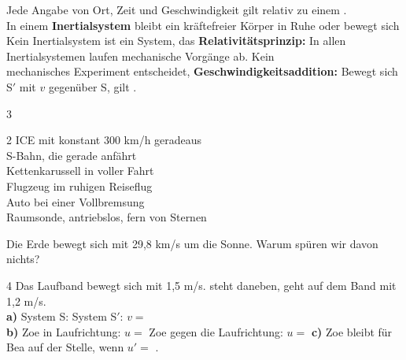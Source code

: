 \documentclass[11pt,a4paper]{article}
\begin{document}
\begin{merke}
\lueckentext
Jede Angabe von Ort, Zeit und Geschwindigkeit gilt relativ zu einem .\\
In einem \textbf{Inertialsystem} bleibt ein kräftefreier Körper in Ruhe oder bewegt sich\\ 
Kein Inertialsystem ist ein System, das 
\textbf{Relativitätsprinzip:} In allen Inertialsystemen laufen mechanische Vorgänge  ab. Kein\\
mechanisches Experiment entscheidet, 
\textbf{Geschwindigkeitsaddition:} Bewegt sich S$'$ mit $v$ gegenüber S, gilt .
\end{merke}

\newpage

\begin{aufgabe}{3}
\begin{multicols}{2}
 ICE mit konstant 300 km/h geradeaus\\
 S-Bahn, die gerade anfährt\\
 Kettenkarussell in voller Fahrt\\
 Flugzeug im ruhigen Reiseflug\\
 Auto bei einer Vollbremsung\\
 Raumsonde, antriebslos, fern von Sternen
\end{multicols}
Die Erde bewegt sich mit 29,8 km/s um die Sonne. Warum spüren wir davon nichts?
\end{aufgabe}

\begin{aufgabe}{4}
Das Laufband bewegt sich mit 1,5 m/s.  steht daneben,  geht auf dem Band mit 1,2 m/s.\\[1mm]
\lueckentext
\textbf{a)} System S:  \quad System S$'$:  \quad $v = $ \\
\textbf{b)} Zoe in Laufrichtung: $u = $ 
 Zoe gegen die Laufrichtung: $u = $ 
\textbf{c)} Zoe bleibt für Bea auf der Stelle, wenn $u' = $ .
\end{aufgabe}
\end{document}
